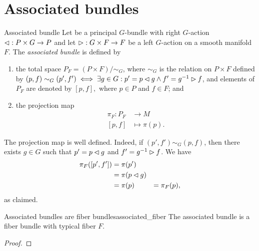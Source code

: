\section{Associated bundles}

\begin{definition}{Associated bundle}{}
    Let  be a principal \(G\)-bundle with right \(G\)-action \(\mathbin{\vartriangleleft} : P \times G \to P\) and let \(\mathbin{\vartriangleright} : G \times F \to F\) be a left \(G\)-action on a smooth manifold \(F\). The \emph{associated bundle}  is defined by
    \begin{enumerate}[label=(\alph*)]
        \item the total space \(P_F = (P \times F) / \sim_G\), where \(\sim_G\) is the relation on \(P \times F\) defined by \((p, f) \sim_G (p', f') \iff \exists g \in G : p' = p \mathbin{\vartriangleleft} g \land f' = g^{-1} \mathbin{\vartriangleright} f\), and elements of \(P_F\) are denoted by \([p,f],\) where \(p \in P\) and \(f \in F\); and
        \item the projection map
            \begin{align*}
                \pi_F : P_F &\to M\\
                      [p,f] &\mapsto \pi(p).
            \end{align*}
    \end{enumerate}
\end{definition}
\begin{remark}
    The projection map is well defined. Indeed, if \((p', f') \sim_G (p, f)\), then there exists \(g\in G\) such that \(p' = p \mathbin{\vartriangleleft} g\) and \(f' = g^{-1} \mathbin{\vartriangleright} f\). We have
    \begin{align*}
        \pi_F([p', f']) &= \pi(p')\\
                        &= \pi(p \mathbin{\vartriangleleft} g)\\
                        &= \pi(p)
                        &= \pi_F(p),
    \end{align*}
    as claimed.
\end{remark}

\begin{proposition}{Associated bundles are fiber bundles}{associated_fiber}
    The associated bundle  is a fiber bundle with typical fiber \(F\).
\end{proposition}
\begin{proof}
    \todo
\end{proof}

